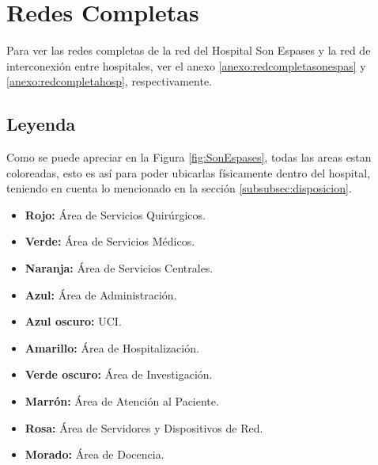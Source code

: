 \section{Redes Completas}

Para ver las redes completas de la red del Hospital Son Espases y la red de interconexión entre hospitales, ver el anexo \ref{anexo:redcompletasonespas} y \ref{anexo:redcompletahosp}, respectivamente.

\subsection{Leyenda}
Como se puede apreciar en la Figura \ref{fig:SonEspases}, todas las areas estan coloreadas, esto es así para poder 
ubicarlas físicamente dentro del hospital, teniendo en cuenta lo mencionado en la sección \ref{subsubsec:disposicion}. 

\begin{itemize}
    \item \textbf{Rojo:} Área de Servicios Quirúrgicos.
    \item \textbf{Verde:} Área de Servicios Médicos.
    \item \textbf{Naranja:} Área de Servicios Centrales.
    \item \textbf{Azul:} Área de Administración.
    \item \textbf{Azul oscuro:} UCI.
    \item \textbf{Amarillo:} Área de Hospitalización.
    \item \textbf{Verde oscuro:} Área de Investigación.
    \item \textbf{Marrón:} Área de Atención al Paciente.
    \item \textbf{Rosa:} Área de Servidores y Dispositivos de Red.
    \item \textbf{Morado:} Área de Docencia.
\end{itemize}
